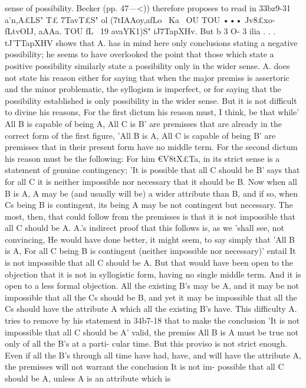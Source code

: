 {{{{{sense of possibility. Becker (pp. 47---<)) therefore proposes to read
in 33bz9-31 a'n,A£LS" T£ 7TavT£S" ol (7tIAAoy,afLo~ Ka~ OU TOU ••• Jv8£xo-
fLtvOIJ, aAAa. TOU fL~ 19 avaYK1)S" iJ7TapXHv. But b 3 O- 3 ilia . . .
tJ'TTapXHV shows that A. has in mind here only conclusions stating a
negative possibility; he seems to have overlooked the point that
those which state a positive possibility similarly state a possibility
only in the wider sense.
A. does not state his reason either for saying that when the
major premiss is assertoric and the minor problematic, the
syllogism is imperfect, or for saying that the possibility established
is only possibility in the wider sense. But it is not difficult to
divine his reasons, For the first dictum his reason must, I think,
be that while' All B is capable of being A, All C is B' are premisses
that are already in the correct form of the first figure, 'All B is
A, All C is capable of being B' are premisses that in their present
form have no middle term. For the second dictum his reason
must be the following: For him €V8tX£Ta, in its strict sense is a
statement of genuine contingency; 'It is possible that all C should
be B' says that for all C it is neither impossible nor necessary
that it should be B. Now when all B is A, A may be (and usually
will be) a wider attribute than B, and if so, when Cs being B
is contingent, its being A may be not contingent but necessary.
The most, then, that could follow from the premisses is that it
is not impossible that all C should be A.
A.'s indirect proof that this follows is, as we 'shall see, not
convincing, He would have done better, it might seem, to say
simply that 'All B is A, For all C being B is contingent (neither
impossible nor necessary)' entail It is not impossible that all C
should be A. But that would have been open to the objection
that it is not in syllogistic form, having no single middle term.
And it is open to a less formal objection. All the existing B's
may be A, and it may be not impossible that all the Cs should be
B, and yet it may be impossible that all the Cs should have the
attribute A which all the existing B's have. This difficulty A.
tries to remove by his statement in 34b7-18 that to make the
conclusion 'It is not impossible that all C should be A' valid, the
premiss All B is A must be true not only of all the B's at a parti-
cular time. But this proviso is not strict enough. Even if all the
B's through all time have had, have, and will have the attribute
A, the premisses will not warrant the conclusion It is not im-
possible that all C should be A, unless A is an attribute which is
}}}}}
